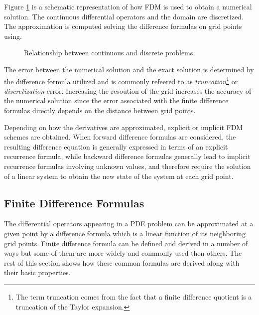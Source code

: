 Figure \ref{fig:schematic_repr_fdm} is a schematic representation of how FDM is used to obtain a numerical solution. The continuous differential operators and the domain are discretized. The approximation is computed solving the difference formulas on grid points using.

   

\begin{figure}[b]
    \centering
    \caption{Relationship between continuous and discrete problems.}
    \label{fig:schematic_repr_fdm}
\end{figure}
    
    The error between the numerical solution and the exact solution is determined by the difference formula utilized and is commonly refeered to as \textit{truncation}\footnote{The term truncation comes from the fact that a finite difference quotient is a truncation of the Taylor expansion.} or \textit{discretization} error.  Increasing the resoution of the grid increases the accuracy of the numerical solution since the error associated with the finite difference formulas directly depends on the distance between grid points.
    
        
    Depending on how the derivatives are approximated, explicit or implicit FDM schemes are
    obtained. When forward difference formulas are considered, the
    resulting difference equation is generally expressed in terms of
    an explicit recurrence formula, while backward difference formulas
    generally lead to implicit recurrence formulas involving unknown
    values, and therefore require the solution of a linear system to
    obtain the new state of the system at each grid point.
    
    
\subsection{Finite Difference Formulas}
The differential operators appearing in a PDE problem can be approximated at a given point by a difference formula which is a linear function of its neighboring grid points. Finite difference formula can be defined and derived in a number of ways  but some of them are more widely and commonly used then others. The rest of this section shows how these common formulas are derived along with their basic properties. 

